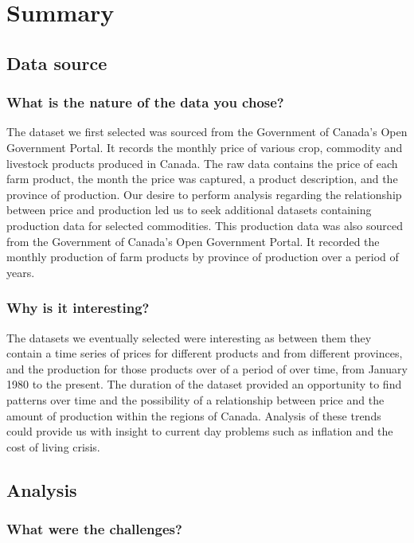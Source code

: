 \section{Summary}

\subsection{Data source}

\subsubsection{What is the nature of the data you chose?}

The dataset we first selected was sourced from the Government of Canada's Open Government Portal.
It records the monthly price of various crop, commodity and livestock products produced in Canada.
The raw data contains the price of each farm product, the month the price was captured, a product description, and the province of production.
Our desire to perform analysis regarding the relationship between price and production led us to seek additional datasets containing production data for selected commodities.
This production data was also sourced from the Government of Canada's Open Government Portal.
It recorded the monthly production of farm products by province of production over a period of years.

\subsubsection{Why is it interesting?}

The datasets we eventually selected were interesting as between them they contain a time series of prices for different products and from different provinces, and the production for those products over of a period of over time, from January 1980 to the present.
The duration of the dataset provided an opportunity to find patterns over time and the possibility of a relationship between price and the amount of production within the regions of Canada.
Analysis of these trends could provide us with insight to current day problems such as inflation and the cost of living crisis.

\subsection{Analysis}

\subsubsection{What were the challenges?}

